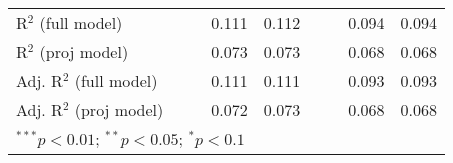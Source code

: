 \begin{sidewaystable}[h]
\begin{center}
{\begin{tabular}{l S[table-format=6.6] S[table-format=6.6] S[table-format=6.6] S[table-format=6.6] S[table-format=6.6] S[table-format=6.6] S[table-format=6.6] S[table-format=6.6]}
R$^2$ (full model)                  &              &              & 0.111        & 0.112        &              &              & 0.094        & 0.094        \\
R$^2$ (proj model)                  &              &              & 0.073        & 0.073        &              &              & 0.068        & 0.068        \\
Adj. R$^2$ (full model)             &              &              & 0.111        & 0.111        &              &              & 0.093        & 0.093        \\
Adj. R$^2$ (proj model)             &              &              & 0.072        & 0.073        &              &              & 0.068        & 0.068        \\
\bottomrule
{}
\end{tabular}}
\label{reg1}
\end{center}
\end{sidewaystable}
